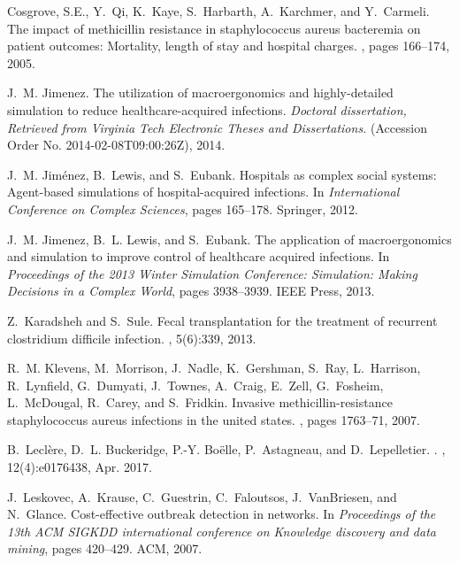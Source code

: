 \documentclass[10pt,letterpaper]{article}
\begin{document}
\begin{thebibliography}{}
Cosgrove, S.E., Y.~Qi, K.~Kaye, S.~Harbarth, A.~Karchmer, and Y.~Carmeli.
\newblock The impact of methicillin resistance in staphylococcus aureus
  bacteremia on patient outcomes: Mortality, length of stay and hospital
  charges.
, pages 166--174,
  2005.

J.~M. Jimenez.
\newblock The utilization of macroergonomics and highly-detailed simulation to reduce healthcare-acquired infections. 
\newblock \emph{Doctoral dissertation, Retrieved from Virginia Tech Electronic Theses and Dissertations.} 
(Accession Order No. 2014-02-08T09:00:26Z), 2014.

J.~M. Jim{\'e}nez, B.~Lewis, and S.~Eubank.
\newblock Hospitals as complex social systems: Agent-based simulations of
  hospital-acquired infections.
\newblock In {\em International Conference on Complex Sciences}, pages
  165--178. Springer, 2012.

J.~M. Jimenez, B.~L. Lewis, and S.~Eubank.
\newblock The application of macroergonomics and simulation to improve control
  of healthcare acquired infections.
\newblock In {\em Proceedings of the 2013 Winter Simulation Conference:
  Simulation: Making Decisions in a Complex World}, pages 3938--3939. IEEE
  Press, 2013.

Z.~Karadsheh and S.~Sule.
\newblock Fecal transplantation for the treatment of recurrent clostridium
  difficile infection.
, 5(6):339, 2013.

R.~M. Klevens, M.~Morrison, J.~Nadle, K.~Gershman, S.~Ray, L.~Harrison,
  R.~Lynfield, G.~Dumyati, J.~Townes, A.~Craig, E.~Zell, G.~Fosheim,
  L.~McDougal, R.~Carey, and S.~Fridkin.
\newblock Invasive methicillin-resistance staphylococcus aureus infections in
  the united states.
, pages 1763--71, 2007.

B.~Lecl{\`e}re, D.~L. Buckeridge, P.-Y. Bo{\"e}lle, P.~Astagneau, and
  D.~Lepelletier.
.
, 12(4):e0176438, Apr. 2017.

J.~Leskovec, A.~Krause, C.~Guestrin, C.~Faloutsos, J.~VanBriesen, and
  N.~Glance.
\newblock Cost-effective outbreak detection in networks.
\newblock In {\em Proceedings of the 13th ACM SIGKDD international conference
  on Knowledge discovery and data mining}, pages 420--429. ACM, 2007.


\end{thebibliography}
\end{document}
